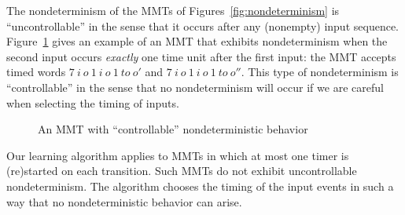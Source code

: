 \fi
%
The nondeterminism of the MMTs of Figures~\ref{fig:nondeterminism} 
is ``uncontrollable'' in the
sense that it occurs after any (nonempty) input sequence.
Figure~\ref{fig:nondeterminism3} gives an example of an MMT that exhibits nondeterminism when the second input occurs \emph{exactly} one time unit after the first input: the MMT accepts timed words
$7 ~ i ~ o ~ 1 ~ i ~ o ~ 1 ~ \mathit{to} ~ o'$ and $7 ~ i ~ o ~ 1 ~ i ~ o ~ 1 ~ \mathit{to} ~ o''$.
This type of nondeterminism is ``controllable'' in the sense that no nondeterminism will occur if we are careful
when selecting the timing of inputs.
\begin{figure}[ht]
\begin{center}
\caption{An MMT with ``controllable'' nondeterministic behavior}
\label{fig:nondeterminism3}
\end{center}
\end{figure}
Our learning algorithm applies to MMTs in which at most one timer is (re)started on each transition. Such MMTs do not
exhibit uncontrollable nondeterminism. The algorithm chooses the timing of the input events in such a way that no
nondeterministic behavior can arise.

